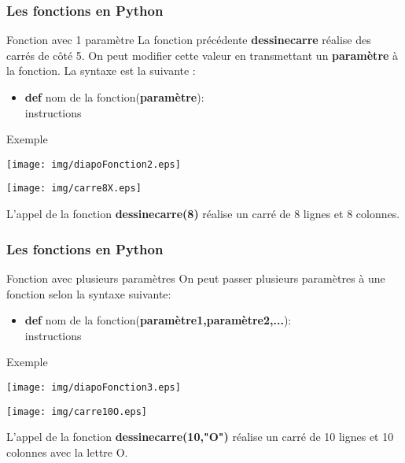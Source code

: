 \documentclass[9pt]{beamer}
\begin{document}
\begin{frame}
\frametitle{Les fonctions en Python}

\begin{block}{Fonction avec 1 paramètre}
La fonction précédente \textbf{dessinecarre} réalise des carrés de côté 5. On peut modifier cette valeur en transmettant un \textbf{paramètre} à la fonction. La syntaxe est la suivante :
\begin{itemize}
\item \textbf{def} nom de la fonction(\textbf{paramètre}):\\
\hspace{0.5cm} instructions
\end{itemize}
\end{block}

\begin{exampleblock}{Exemple}
\begin{minipage}{0.75\textwidth}
\texttt{[image: img/diapoFonction2.eps]}
\end{minipage}
\begin{minipage}{0.2\textwidth}
\texttt{[image: img/carre8X.eps]}
\end{minipage}\medskip

L'appel de la fonction \textbf{dessinecarre(8)} réalise un carré de 8 lignes et 8 colonnes.
\end{exampleblock}

\end{frame}

\begin{frame}
\frametitle{Les fonctions en Python}

\begin{block}{Fonction avec plusieurs paramètres}
On peut passer plusieurs paramètres à une fonction selon la syntaxe suivante:
\begin{itemize}
\item \textbf{def} nom de la fonction(\textbf{paramètre1,paramètre2,...}):\\
\hspace{0.5cm} instructions
\end{itemize}
\end{block}

\begin{exampleblock}{Exemple}
\begin{minipage}{0.75\textwidth}
\texttt{[image: img/diapoFonction3.eps]}
\end{minipage}
\begin{minipage}{0.2\textwidth}
\texttt{[image: img/carre10O.eps]}
\end{minipage}\medskip

L'appel de la fonction \textbf{dessinecarre(10,"O")} réalise un carré de 10 lignes et 10 colonnes avec la lettre O.
\end{exampleblock}

\end{frame}
\end{document}

